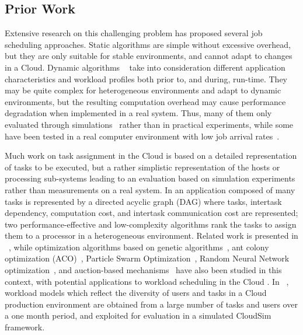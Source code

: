 \documentclass[journal]{IEEEtran}
\begin{document}
\subsection{Prior Work}
\label{survey}

Extensive research on this challenging problem has proposed several job scheduling approaches. Static algorithms \cite{tantawi1985optimal,kim1992algorithm,kameda2011optimal} are simple without excessive overhead, but they are only suitable for stable environments, and cannot adapt to changes in a Cloud. Dynamic algorithms ~\cite{wolff2001dynamic,rimal2009taxonomy,zhang2010load,tian2011dynamic} take into consideration different application characteristics and workload profiles both prior to, and during, run-time. They may be quite complex for heterogeneous environments and adapt to dynamic environments, but the resulting computation overhead may cause performance degradation when implemented in a real system. Thus, many of them only evaluated through simulations~\cite{Xiaomin2011} rather than in practical experiments, while some have been tested in a real computer environment with low job arrival rates~\cite{Delimitrou2013}. 



Much work on task assignment in the Cloud is based on a detailed representation of tasks to be executed, but a rather simplistic representation of the hosts or processing sub-systems
leading to an evaluation based on simulation experiments rather than measurements on a real system. In \cite{Topcuouglu2002} an application composed of many tasks is represented by a directed acyclic graph (DAG) where tasks, intertask dependency, computation cost, and intertask communication cost are represented; two performance-effective and low-complexity algorithms rank the tasks to assign them to a processor in a heterogeneous environment. Related work is presented in ~\cite{Sih1993,Kwok1996}, while optimization algorithms based on genetic algorithms~\cite{Hou1994}, ant colony optimization (ACO)~\cite{WeiNeng2009}, Particle Swarm Optimization~\cite{Pandey2010}, Random Neural Network optimization~\cite{DBLP:journals/neco/GelenbeF99,Gelenbe2010_nearOptAssign}, and auction-based mechanisms~\cite{Zaman2011} have
also been studied in this context, with potential applications to workload scheduling in the Cloud  \cite{Lin2011}.
	In ~\cite{Moreno2014}, workload models which reflect the diversity of users and tasks in a Cloud production environment are obtained  from a large number of tasks and users over a one month 
	period, and exploited for evaluation in a simulated CloudSim framework.
\end{document}
